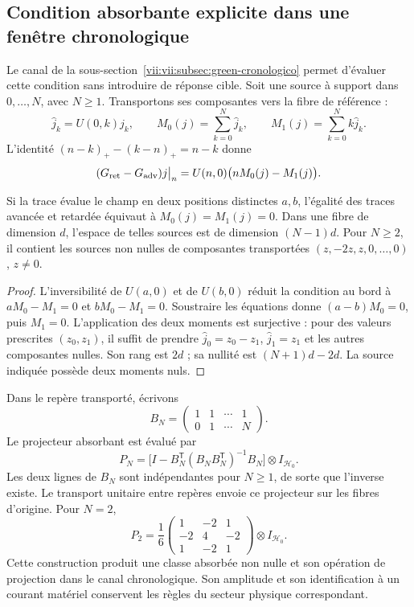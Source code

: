 \subsection{Condition absorbante explicite dans une fenêtre chronologique}
\label{vii:vii:subsec:absorcion-momentos}

Le canal de la sous-section~\ref{vii:vii:subsec:green-cronologico} permet
d'évaluer cette condition sans introduire de réponse cible. Soit une
source à support dans \(0,\ldots,N\), avec \(N\geq1\). Transportons
ses composantes vers la fibre de référence :
\[
 \widehat j_k=U(0,k)j_k,\qquad
 M_0(j)=\sum_{k=0}^N\widehat j_k,\qquad
 M_1(j)=\sum_{k=0}^Nk\widehat j_k.
\]
L'identité \((n-k)_+-(k-n)_+=n-k\) donne
\begin{equation}
 (G_{\rm ret}-G_{\rm adv})j\big|_n
 =U(n,0)\bigl(nM_0(j)-M_1(j)\bigr).
 \label{vii:vii:eq:diferencia-green-momentos}
\end{equation}

\begin{proposition}
\label{vii:vii:prop:absorcion-momentos}
Si la trace évalue le champ en deux positions distinctes \(a,b\),
l'égalité des traces avancée et retardée équivaut à
\(M_0(j)=M_1(j)=0\). Dans une fibre de dimension \(d\), l'espace
de telles sources est de dimension \((N-1)d\). Pour \(N\geq2\),
il contient les sources non nulles de composantes transportées
\((z,-2z,z,0,\ldots,0)\), \(z\neq0\).
\end{proposition}
\begin{proof}
L'inversibilité de \(U(a,0)\) et de \(U(b,0)\) réduit la condition
au bord à \(aM_0-M_1=0\) et \(bM_0-M_1=0\).
Soustraire les équations donne \((a-b)M_0=0\), puis \(M_1=0\).
L'application des deux moments est surjective : pour des valeurs prescrites
\((z_0,z_1)\), il suffit de prendre
\(\widehat j_0=z_0-z_1\), \(\widehat j_1=z_1\) et les autres
composantes nulles. Son rang est \(2d\) ; sa nullité est
\((N+1)d-2d\). La source indiquée possède deux moments nuls.
\end{proof}

Dans le repère transporté, écrivons
\[
 B_N=\begin{pmatrix}1&1&\cdots&1\\0&1&\cdots&N\end{pmatrix}.
\]
Le projecteur absorbant est évalué par
\begin{equation}
 P_N=\bigl[I-B_N^{\mathsf T}(B_NB_N^{\mathsf T})^{-1}B_N\bigr]
       \otimes I_{\mathcal H_0}.
 \label{vii:vii:eq:proyector-momentos-cronologicos}
\end{equation}
Les deux lignes de \(B_N\) sont indépendantes pour \(N\geq1\), de sorte que l'inverse existe. Le transport unitaire entre repères envoie ce projecteur sur les fibres d'origine. Pour \(N=2\),
\[
 P_2=\frac16
 \begin{pmatrix}1&-2&1\\-2&4&-2\\1&-2&1\end{pmatrix}
 \otimes I_{\mathcal H_0}.
\]
Cette construction produit une classe absorbée non nulle et son opération de
projection dans le canal chronologique. Son amplitude et son identification à un
courant matériel conservent les règles du secteur physique correspondant.

